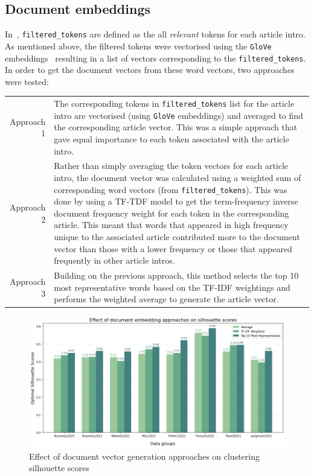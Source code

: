 \newpage
\subsection{Document embeddings}

In~, \texttt{filtered\_tokens} are defined as the all \textit{relevant} tokens for each article intro. As mentioned above, the filtered tokens were vectorised using the \texttt{GloVe} embeddings~\cite{glove} resulting in a list of vectors corresponding to the \texttt{filtered\_tokens}. In order to get the document vectors from these word vectors, two approaches were tested: 

\renewcommand\arraystretch{2}
\captionsetup{singlelinecheck=false, labelfont=sc, labelsep=quad}
\begin{longtable}{@{\,}r <{\hskip 2pt} !{\foo} >{\arraybackslash}p{14cm}}
\centering

Approach 1 & The corresponding tokens in \texttt{filtered\_tokens} list for the article intro are vectorised (using \texttt{GloVe} embeddings) and averaged to find the corresponding article vector. This was a simple approach that gave equal importance to each token associated with the article intro. \\

Approach 2 & Rather than simply averaging the token vectors for each article intro, the document vector was calculated using a weighted sum of corresponding word vectors (from \texttt{filtered\_tokens}). This was done by using a TF-TDF model to get the term-frequency inverse document frequency weight for each token in the corresponding article. This meant that words that appeared in high frequency unique to the associated article contributed more to the document vector than those with a lower frequency or those that appeared frequently in other article intros. \\

Approach 3 & Building on the previous approach, this method selects the top 10 most representative words based on the TF-IDF weightings and performs the weighted average to generate the article vector.\\
\end{longtable}
\vspace{-2ex}
\begin{figure}[H]
  \centering
  \includegraphics[width=0.8\linewidth]{images/eval/doc_embedding_sil.png}
  \vspace{-1em}
  \caption{Effect of document vector generation approaches on clustering silhouette scores}
  \label{fig:doc_embeddings}
  \end{figure}

